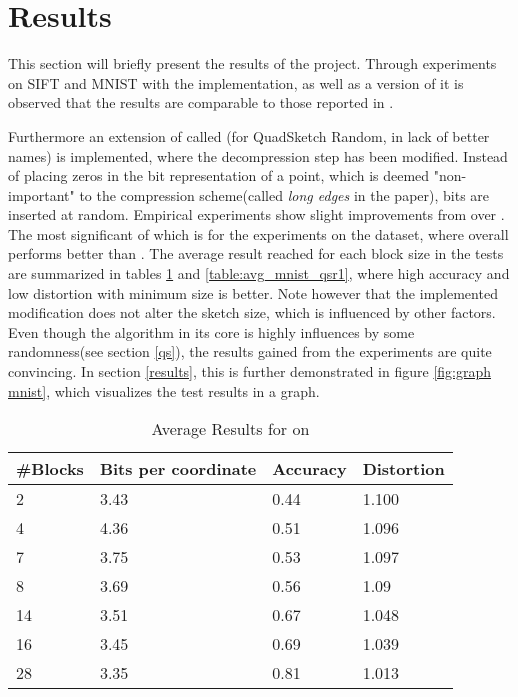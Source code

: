 \section{Results}
\label{contribution}
This section will briefly present the results of the project. Through experiments on SIFT and MNIST with the \qs{} implementation, as well as a version of \gr{} it is observed that the results are comparable to those reported in \cite{wagner17}. 

Furthermore an extension of \qs{} called \qsr{} (for QuadSketch Random, in lack of better names) is implemented, where the decompression step has been modified. Instead of placing zeros in the bit representation of a point, which is deemed "non-important" to the compression scheme(called \textit{long edges} in the paper), bits are inserted at random. Empirical experiments show slight improvements from \qsr{} over \qs{}. The most significant of which is for the experiments on the \mnist{} dataset, where \qsr{} overall performs better than \qs{}. The average result reached for each block size in the tests are summarized in tables \ref{table:avg_mnist_qs1} and \ref{table:avg_mnist_qsr1}, where high accuracy and low distortion with minimum size is better. Note however that the implemented modification does not alter the sketch size, which is influenced by other factors. Even though the algorithm in its core is highly influences by some randomness(see section \ref{qs}), the results gained from the experiments are quite convincing. In section \ref{results}, this is further demonstrated in figure \ref{fig:graph mnist}, which visualizes the test results in a graph.


\begin{table}[h]
	\centering
	\caption{Average Results for \qs{} on \mnist{}}
	\label{table:avg_mnist_qs1}
	\begin{tabular}{l l l l}
		\hline
		\#Blocks & Bits per coordinate & Accuracy  & Distortion \\ \hline
		2 & 3.43 & 0.44 & 1.100  \\
		4 & 4.36 & 0.51 & 1.096  \\
		7 & 3.75 & 0.53 & 1.097 \\
		8 & 3.69 & 0.56 & 1.09 \\
		14 & 3.51 & 0.67 & 1.048 \\
		16 & 3.45 & 0.69 & 1.039 \\
		28 & 3.35 & 0.81 & 1.013 \\
		\hline
	\end{tabular}
\end{table}


